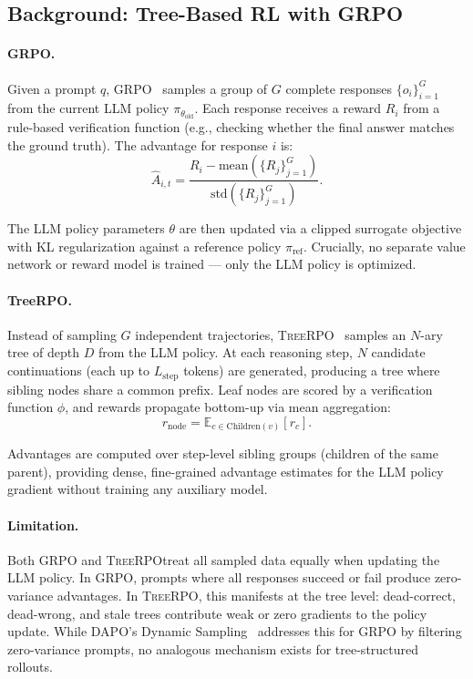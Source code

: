 \documentclass{article} %
\newcommand{\TreeRPO}{\textsc{TreeRPO}}
\begin{document}
\subsection{Background: Tree-Based RL with GRPO}
\label{sec:background}

\paragraph{GRPO.} Given a prompt $q$, GRPO~\citep{deepseekmathgrpo} samples a group of $G$ complete responses $\{o_i\}_{i=1}^G$ from the current LLM policy $\pi_{\theta_\text{old}}$. Each response receives a reward $R_i$ from a rule-based verification function (e.g., checking whether the final answer matches the ground truth). The advantage for response $i$ is:
\begin{equation}
    \hat{A}_{i,t} = \frac{R_i - \text{mean}(\{R_j\}_{j=1}^G)}{\text{std}(\{R_j\}_{j=1}^G)}.
    \label{eq:grpo_adv}
\end{equation}

The LLM policy parameters $\theta$ are then updated via a clipped surrogate objective with KL regularization against a reference policy $\pi_\text{ref}$. Crucially, no separate value network or reward model is trained --- only the LLM policy is optimized.

\paragraph{TreeRPO.} Instead of sampling $G$ independent trajectories, \TreeRPO~\citep{treerpo} samples an $N$-ary tree of depth $D$ from the LLM policy. At each reasoning step, $N$ candidate continuations (each up to $L_\text{step}$ tokens) are generated, producing a tree where sibling nodes share a common prefix. Leaf nodes are scored by a verification function $\phi$, and rewards propagate bottom-up via mean aggregation:
\begin{equation}
    r_\text{node} = \mathbb{E}_{c \in \text{Children}(v)} [r_c].
    \label{eq:propagate}
\end{equation}

Advantages are computed over step-level sibling groups (children of the same parent), providing dense, fine-grained advantage estimates for the LLM policy gradient without training any auxiliary model.

\paragraph{Limitation.} Both GRPO and \TreeRPO treat all sampled data equally when updating the LLM policy. In GRPO, prompts where all responses succeed or fail produce zero-variance advantages. In \TreeRPO, this manifests at the tree level: dead-correct, dead-wrong, and stale trees contribute weak or zero gradients to the policy update. While DAPO's Dynamic Sampling~\citep{dapo} addresses this for GRPO by filtering zero-variance prompts, no analogous mechanism exists for tree-structured rollouts.
\end{document}
